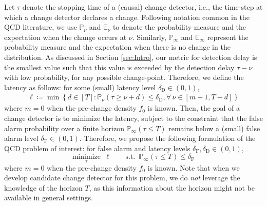 \documentclass[12pt]{interact}
\newcommand{\lp}{\left(}
\newcommand{\rp}{\right)}
\newcommand{\lb}{\left[}
\newcommand{\rb}{\right]}
\newcommand{\lbp}{\left\{}
\newcommand{\rbp}{\right\}}
\newcommand{\mrm}{\mathrm}
\newcommand{\E}{\mathbb{E}}
\renewcommand{\Pr}{\mathbb{P}}
\theoremstyle{plain}
\begin{document}
Let $\tau$ denote the stopping time of a (causal) change detector, i.e., the time-step at which a change detector declares a change. Following notation common in the QCD literature, we use $\Pr_{\nu}$ and $\E_{\nu}$ to denote the probability measure and the expectation when the change occurs at $\nu$. Similarly, $\Pr_{\infty}$ and $\E_{\infty}$ represent the probability measure and the expectation when there is no change in the distribution. As discussed in Section \ref{sec:Intro}, our metric for detection delay is the smallest value  such that this value is exceeded by the detection delay $\tau - \nu$ with low probability, for any possible change-point. Therefore, we define the latency as follows: for some (small) latency level $\delta_{\mrm{D}} \in (0,1)$,
%
\begin{align} \label{eq:latency}
    \ell \coloneqq \min \lbp d \in [T]: \Pr_{\nu} \lp \tau \geq \nu + d \rp \leq \delta_{\mathrm{D}}, \forall\, \nu \in \lb m+1, T-d \rb  \rbp
\end{align}
%
where $m = 0$ when the pre-change density $f_{0}$ is known. Then, the goal of a change detector is to minimize the latency, subject to the constraint that the false alarm probability over a finite horizon $\Pr_{\infty} \lp \tau \leq T \rp$ remains below a (small) false alarm level $\delta_{\mrm{F}} \in (0,1)$. Therefore, we propose the following formulation of the QCD problem of interest: for false alarm and latency levels $\delta_{\mrm{F}}, \delta_{\mrm{D}} \in \lp 0, 1 \rp$,
%
\begin{equation}
    \underset{\tau}{\textrm{minimize}} \enspace \ell \quad\quad \textrm{s.t.}\enspace\Pr_{\infty}\lp\tau\leq T\rp\leq\delta_{\mathrm{F}}
\label{eq:QCD}
\end{equation}
where $m = 0$ when the pre-change density $f_{0}$ is known. Note that when we develop candidate change detector for this problem, we do \emph{not} leverage the knowledge of the horizon $T$, as this information about the horizon might not be available in general settings.
%

%
%
\end{document}
